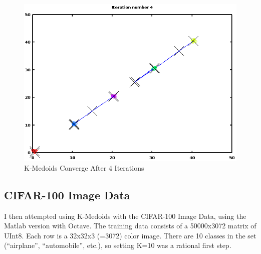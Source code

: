 \documentclass[11pt, oneside]{article}   	%
\begin{document}
\begin{figure}[h!]
\centering
\includegraphics[scale=0.6]{K-Medoid}
\caption{K-Medoids Converge After 4 Iterations}
\end{figure}

\subsection*{CIFAR-100 Image Data}

I then attempted using K-Medoids with the CIFAR-100 Image Data, using the Matlab version with Octave. The training data consists of a 50000x3072 matrix of UInt8. Each row is a 32x32x3 (=3072) color image. There are 10 classes in the set (``airplane'', ``automobile'', etc.), so setting K=10 was a rational first step.
\end{document}
